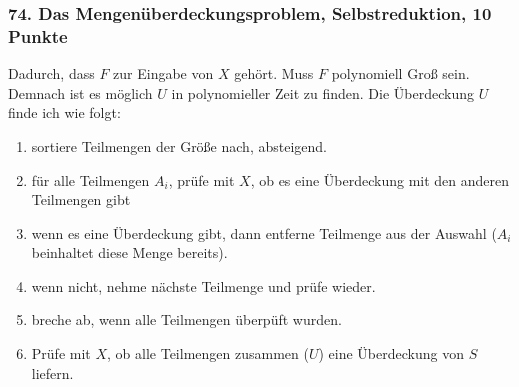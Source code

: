 \documentclass[ngerman,a4paper]{report}
\begin{document}

\subsubsection*{74. Das Mengenüberdeckungsproblem, Selbstreduktion, 10 Punkte}
Dadurch, dass $F$ zur Eingabe von $X$ gehört. Muss $F$ polynomiell Groß sein. Demnach ist es möglich $U$ in polynomieller Zeit zu finden. Die Überdeckung $U$ finde ich wie folgt:
\begin{enumerate}
\item sortiere Teilmengen der Größe nach, absteigend.
\item für alle Teilmengen $A_i$, prüfe mit $X$, ob es eine Überdeckung mit den anderen Teilmengen gibt
\item wenn es eine Überdeckung gibt, dann entferne Teilmenge aus der Auswahl ($A_i$ beinhaltet diese Menge bereits).
\item wenn nicht, nehme nächste Teilmenge und prüfe wieder.
\item breche ab, wenn alle Teilmengen überpüft wurden.
\item Prüfe mit $X$, ob alle Teilmengen zusammen ($U$) eine Überdeckung von $S$ liefern.
\end{enumerate}
\end{document}

